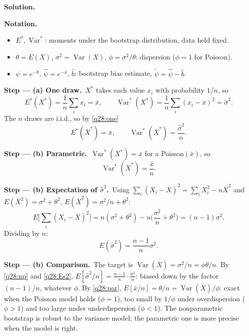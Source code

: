 \documentclass[11pt,a4paper]{article}
\numberwithin{equation}{questao}   %
\newenvironment{notacao}{\par\smallskip\noindent\textbf{Notation.}\begin{itemize}[leftmargin=1.4em,topsep=1pt,itemsep=0pt]\small}{\end{itemize}}
\newcommand{\passo}[2]{\par\smallskip\noindent\textbf{Step --- #1.}~#2}
\newcommand{\solhead}{\par\medskip\noindent{\color{blue!55!black}\rule{\linewidth}{0.3pt}}\par\noindent\textbf{Solution.}}
\newcommand{\Var}{\operatorname{Var}}
\newcommand{\1}{\mathbf{1}}
\begin{document}
\begin{sol}
\solhead
\begin{notacao}
\item $E^*,\Var^*$: moments under the bootstrap distribution, data held fixed.
\item $\theta=E(X)$, $\sigma^2=\Var(X)$, $\phi=\sigma^2/\theta$: dispersion ($\phi=1$ for Poisson).
\item $\psi=e^{-\theta}$, $\hat\psi=e^{-\bar x}$, $\hat b$: bootstrap bias estimate, $\tilde\psi=\hat\psi-\hat b$.
\end{notacao}

\passo{(a) One draw}{$X^*$ takes each value $x_i$ with probability $1/n$, so}
\begin{equation}\label{q28:one}
E^*(X^*)=\frac1n\sum_ix_i=\bar x,\qquad \Var^*(X^*)=\frac1n\sum_i(x_i-\bar x)^2=\hat\sigma^2 .
\end{equation}
The $n$ draws are i.i.d., so by \eqref{q28:one}
\begin{equation}\label{q28:np}
E^*(\overline X^*)=\bar x,\qquad \Var^*(\overline X^*)=\frac{\hat\sigma^2}{n}.
\end{equation}

\passo{(b) Parametric}{$\Var^*(X^*)=\bar x$ for a Poisson$(\bar x)$, so}
\begin{equation}\label{q28:par}
\Var^*(\overline X^*)=\frac{\bar x}{n}.
\end{equation}

\passo{(b) Expectation of $\hat\sigma^2$}{Using $\sum_i(X_i-\overline X)^2=\sum_iX_i^2-n\overline X^2$
and $E(X^2)=\sigma^2+\theta^2$, $E(\overline X^2)=\sigma^2/n+\theta^2$:}
\[
E\Big[\sum_i(X_i-\overline X)^2\Big]=n(\sigma^2+\theta^2)-n\Big(\frac{\sigma^2}n+\theta^2\Big)=(n-1)\sigma^2 .
\]
Dividing by $n$:
\begin{equation}\label{q28:Es2}
E(\hat\sigma^2)=\frac{n-1}{n}\sigma^2 .
\end{equation}

\passo{(b) Comparison}{The target is $\Var(\overline X)=\sigma^2/n=\phi\theta/n$. By \eqref{q28:np} and
\eqref{q28:Es2}, $E[\hat\sigma^2/n]=\frac{n-1}n\cdot\frac{\sigma^2}n$: biased down by the factor
$(n-1)/n$, whatever $\phi$. By \eqref{q28:par}, $E[\bar x/n]=\theta/n=\Var(\overline X)/\phi$: exact when
the Poisson model holds ($\phi=1$), too small by $1/\phi$ under overdispersion ($\phi>1$) and too
large under underdispersion ($\phi<1$). The nonparametric bootstrap is robust to the variance model;
the parametric one is more precise when the model is right.}


\end{sol}
\end{document}
